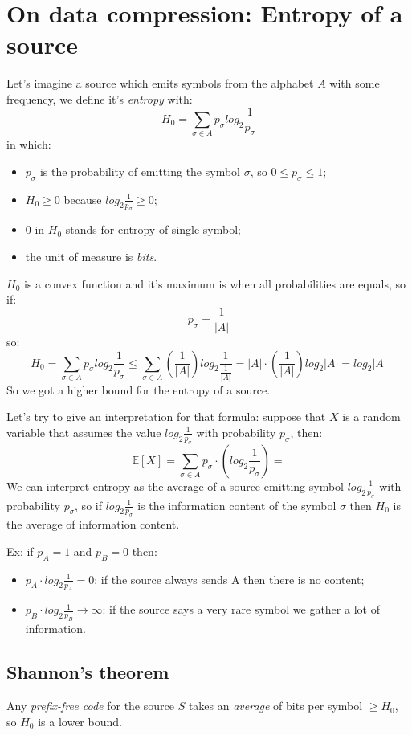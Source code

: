 \section{On data compression: Entropy of a source}
Let's imagine a source which emits symbols from the alphabet $A$ with some frequency, we define it's \emph{entropy} with:
$$
    H_0 = \sum_{\sigma \in A} p_{\sigma} log_2 \frac{1}{p_{\sigma}}
$$
in which:
\begin{itemize}
    \item $p_{\sigma}$ is the probability of emitting the symbol $\sigma$, so $0 \leq p_{\sigma} \leq 1$;
    \item $H_0 \geq 0$ because $log_2 \frac{1}{p_{\sigma}} \geq 0$;
    \item 0 in $H_0$ stands for entropy of single symbol;
    \item the unit of measure is \emph{bits}.
\end{itemize}

$H_0$ is a convex function and it's maximum is when all probabilities are equals, so if:
$$
    p_{\sigma} = \frac{1}{|A|}
$$
so:
$$
    H_0 = \sum_{\sigma \in A} p_{\sigma} log_2 \frac{1}{p_{\sigma}} \leq \sum_{\sigma \in A} \left( \frac{1}{|A|} \right) log_2 \frac{1}{\frac{1}{|A|}} = |A| \cdot \left( \frac{1}{|A|} \right) log_2 |A| = log_2 |A|
$$
So we got a higher bound for the entropy of a source.

Let's try to give an interpretation for that formula: suppose that $X$ is a random variable that assumes the value $log_2 \frac{1}{p_{\sigma}}$ with probability $p_{\sigma}$, then:
$$
    \mathbb{E}[X] = \sum_{\sigma \in A} p_{\sigma} \cdot \left(  log_2 \frac{1}{p_{\sigma}} \right)=
$$
We can interpret entropy as the average of a source emitting symbol $log_2 \frac{1}{p_{\sigma}}$ with probability $p_{\sigma}$, so if $log_2 \frac{1}{p_{\sigma}}$ is the information content of the symbol $\sigma$ then $H_0$ is the average of information content.

Ex: if $p_A = 1$ and $p_B = 0$ then:
\begin{itemize}
    \item $p_A \cdot log_2 \frac{1}{p_A} = 0$: if the source always sends A then there is no content;
    \item $p_B \cdot log_2 \frac{1}{p_B} \xrightarrow{} \infty$: if the source says a very rare symbol we gather a lot of information.
\end{itemize}

\subsection{Shannon's theorem}
Any \emph{prefix-free code} for the source $S$ takes an \emph{average} of bits per symbol $\geq H_0$, so $H_0$ is a lower bound.

